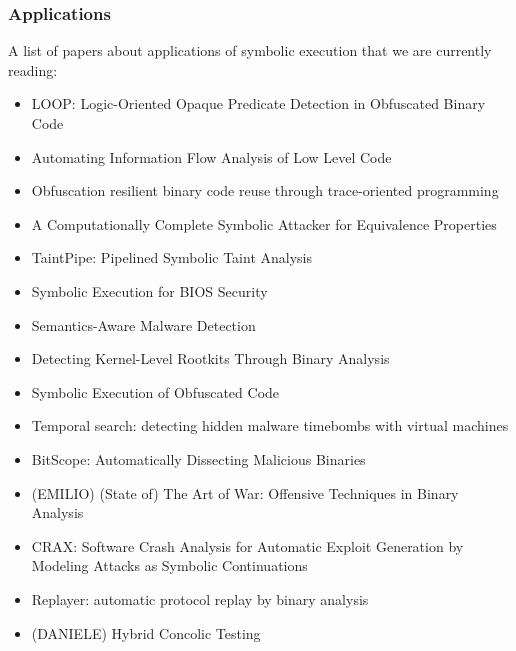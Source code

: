 \documentclass[10pt, a4paper]{article}
\begin{document}
\subsubsection{Applications}
A list of papers about applications of symbolic execution that we are currently reading:
\begin{itemize}
  \item \cite{LOOP-CCS15} LOOP: Logic-Oriented Opaque Predicate Detection in Obfuscated Binary Code
  \item \cite{BDG-CCS14} Automating Information Flow Analysis of Low Level Code
  \item \cite{ZFM-CCS13} Obfuscation resilient binary code reuse through trace-oriented programming
  \item \cite{BC-CCS14} A Computationally Complete Symbolic Attacker for Equivalence Properties
  \item \cite{MWX-USEC15} TaintPipe: Pipelined Symbolic Taint Analysis
  \item \cite{BLR-WOOT15} Symbolic Execution for {BIOS} Security
  \item \cite{CJS-SP05} Semantics-Aware Malware Detection
  \item \cite{KRV-ACSAC04} Detecting Kernel-Level Rootkits Through Binary Analysis
  \item \cite{YD-CCS15} Symbolic Execution of Obfuscated Code
  \item \cite{CWO-ASPLOS06} Temporal search: detecting hidden malware timebombs with virtual machines
  \item \cite{BHK-TR07} BitScope: Automatically Dissecting Malicious Binaries
  \item (EMILIO) \cite{ANGR-SP16} (State of) The Art of War: Offensive Techniques in Binary Analysis
  \item \cite{CRAX-SERE12} CRAX: Software Crash Analysis for Automatic Exploit Generation by Modeling Attacks as Symbolic Continuations
  \item \cite{REPLAYER-CCS06} Replayer: automatic protocol replay by binary analysis
  \item (DANIELE) \cite{RK-ICSE07} Hybrid Concolic Testing
\end{itemize}


\end{document}
